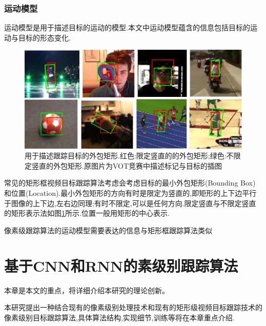 \subsection{运动模型}
运动模型是用于描述目标的运动的模型.本文中运动模型蕴含的信息包括目标的运动与目标的形态变化.
\par
\begin{figure}[htbp!]
    \centering
    \includegraphics[width = 1.\textwidth]{chap/img/overlap_examples.pdf}
    \caption{用于描述跟踪目标的外包矩形.红色:限定竖直的的外包矩形;绿色:不限定竖直的外包矩形.原图片为VOT竞赛中描述标记与目标的插图\supercite{VOT_TPAMI}}\label{fig:bunding_boxes}
\end{figure}
\par
常见的矩形框视频目标跟踪算法考虑会考虑目标的最小外包矩形(Bounding Box)和位置(Location).最小外包矩形的方向有时是限定为竖直的,即矩形的上下边平行于图像的上下边,左右边同理;有时不限定,可以是任何方向.限定竖直与不限定竖直的矩形表示法如图\ref{fig:bunding_boxes}所示.位置一般用矩形的中心表示.
\par
像素级跟踪算法的运动模型需要表达的信息与矩形框跟踪算法类似

\chapter{基于CNN和RNN的素级别跟踪算法}
本章是本文的重点，将详细介绍本研究的理论创新。
\par
本研究提出一种结合现有的像素级别处理技术和现有的矩形级视频目标跟踪技术的像素级别目标跟踪算法,具体算法结构,实现细节,训练等将在本章重点介绍.
